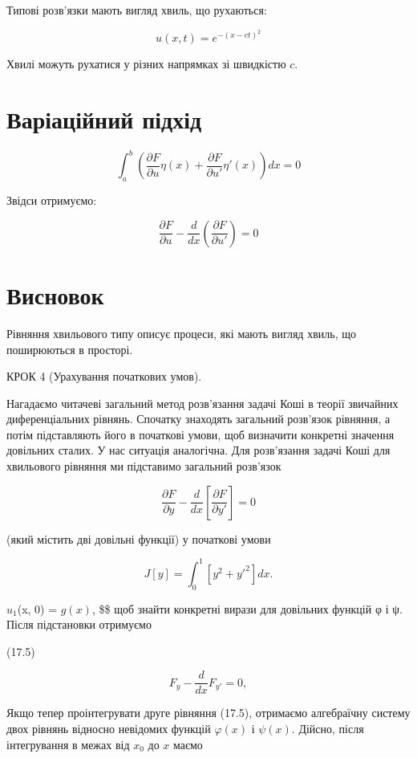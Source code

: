 \documentclass[
  ukrainian,
]{article}
\begin{document}
Типові розв'язки мають вигляд хвиль, що рухаються:

\[
u(x,t) = e^{-(x - ct)^2}
\]

Хвилі можуть рухатися у різних напрямках зі швидкістю \(c\).

\section{Варіаційний
підхід}\label{ux432ux430ux440ux456ux430ux446ux456ux439ux43dux438ux439-ux43fux456ux434ux445ux456ux434}

\[
\int_a^b \left( \frac{\partial F}{\partial u} \eta(x) + \frac{\partial F}{\partial u'} \eta'(x) \right) dx = 0
\]

Звідси отримуємо:

\[
\frac{\partial F}{\partial u} - \frac{d}{dx}\left( \frac{\partial F}{\partial u'} \right) = 0
\]

\section{Висновок}\label{ux432ux438ux441ux43dux43eux432ux43eux43a-1}

Рівняння хвильового типу описує процеси, які мають вигляд хвиль, що
поширюються в просторі.

КРОК 4 (Урахування початкових умов).

Нагадаємо читачеві загальний метод розв'язання задачі Коші в теорії
звичайних диференціальних рівнянь. Спочатку знаходять загальний
розв'язок рівняння, а потім підставляють його в початкові умови, щоб
визначити конкретні значення довільних сталих. У нас ситуація
аналогічна. Для розв'язання задачі Коші для хвильового рівняння ми
підставимо загальний розв'язок

\[
\frac{\partial F}{\partial y} - \frac{d}{dx} \left[ \frac{\partial F}{\partial y'} \right] = 0
\]

(який містить дві довільні функції) у початкові умови

\[
J[y] = \int_{0}^{1} [y^{2} + y'^{2}] dx.
\]

\(u_1\)(x, 0) = \(g(x)\), \$\$ щоб знайти конкретні вирази для довільних
функцій φ і ψ. Після підстановки отримуємо

(17.5)

\[
F_y - \frac{d}{dx} F_{y'} = 0,
\]

Якщо тепер проінтегрувати друге рівняння (17.5), отримаємо алгебраїчну
систему двох рівнянь відносно невідомих функцій \(\varphi(x)\) і
\(\psi(x)\). Дійсно, після інтегрування в межах від \(x_0\) до \(x\)
маємо
\end{document}
